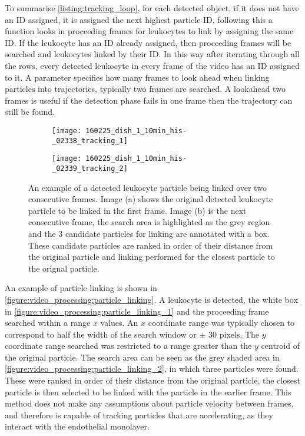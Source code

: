 To summarise \autoref{listing:tracking_loop}, for each detected object, if it does not have an ID assigned, it is assigned the next highest particle ID, following this a function looks in proceeding frames for leukocytes to link by assigning the same ID. If the leukocyte has an ID already assigned, then proceeding frames will be searched and leukocytes linked by their ID. In this way after iterating through all the rows, every detected leukocyte in every frame of the video has an ID assigned to it. A parameter specifies how many frames to look ahead when linking particles into trajectories, typically two frames are searched. A lookahead two frames is useful if the detection phase fails in one frame then the trajectory can still be found.

\begin{figure}[htbp]{}
	\centering
	\begin{subfigure}[b]{0.49\linewidth}
		\texttt{[image: 160225\_dish\_1\_10min\_his-\_02338\_tracking\_1]}
		\caption{}
		\label{figure:video_processing:particle_linking_1}
	\end{subfigure}
	\begin{subfigure}[b]{0.49\linewidth}
		\texttt{[image: 160225\_dish\_1\_10min\_his-\_02339\_tracking\_2]}
		\caption{}
		\label{figure:video_processing:particle_linking_2}
	\end{subfigure}
\caption[Leukocyte particle linking]{An example of a detected leukocyte particle being linked over two consecutive frames. Image (a) shows the original detected leukocyte particle to be linked in the first frame. Image (b) is the next consecutive frame, the search area is highlighted as the grey region and the 3 candidate particles for linking are annotated with a box. These candidate particles are ranked in order of their distance from the original particle and linking performed for the closest particle to the orignal particle.}
\label{figure:video_processing:particle_linking}
\end{figure}

An example of particle linking is shown in \autoref{figure:video_processing:particle_linking}. A leukocyte is detected, the white box in \autoref{figure:video_processing:particle_linking_1} and the proceeding frame searched within a range $x$ values. An $x$ coordinate range was typically chosen to correspond to half the width of the search window or $\pm$ 30 pixels. The $y$ coordinate range searched was restricted to a range greater than the $y$ centroid of the original particle. The search area can be seen as the grey shaded area in \autoref{figure:video_processing:particle_linking_2}, in which three particles were found. These were ranked in order of their distance from the original particle, the closest particle is then selected to be linked with the particle in the earlier frame. This method does not make any assumptions about particle velocity between frames, and therefore is capable of tracking particles that are accelerating, as they interact with the endothelial monolayer.

